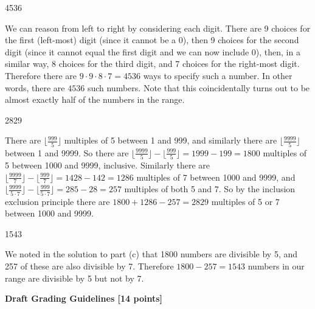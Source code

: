 \documentclass[12pt]{exam}
\begin{document}
\begin{solution}
\begin{qparts}
    \item 4536
    
    We can reason from left to right by considering each digit. There are 9 choices for the first (left-most) digit (since it cannot be a 0), then 9 choices for the second digit (since it cannot equal the first digit and we can now include 0), then, in a similar way, 8 choices for the third digit, and 7 choices for the right-most digit.  Therefore there are $9\cdot9\cdot8\cdot7 = 4536$ ways to specify such a number. In other words, there are $4536$ such numbers. Note that this coincidentally turns out to be almost exactly half of the numbers in the range.

    \item 2829
    
    There are $\lfloor \frac{999}{5}\rfloor$ multiples of 5 between 1 and 999, and similarly there are $\lfloor \frac{9999}{5}\rfloor$ between 1 and 9999. So there are $\lfloor \frac{9999}{5}\rfloor - \lfloor \frac{999}{5}\rfloor = 1999 - 199 = 1800$ multiples of 5 between 1000 and 9999, inclusive. Similarly there are $\lfloor \frac{9999}{7}\rfloor - \lfloor \frac{999}{7}\rfloor = 1428 - 142 = 1286$ multiples of 7 between 1000 and 9999, and $\lfloor \frac{9999}{5\cdot 7}\rfloor - \lfloor \frac{999}{5\cdot 7}\rfloor = 285-28 = 257$ multiples of both 5 and 7. So by the inclusion exclusion principle there are $1800 + 1286 - 257 = 2829$ multiples of 5 or 7 between 1000 and 9999.

    \item 1543
    
    We noted in the solution to part (c) that 1800 numbers are divisible by 5, and 257 of these are also divisible by 7. Therefore $1800 - 257 = 1543$ numbers in our range are divisible by 5 but not by 7.
\end{qparts}

\textbf{Draft Grading Guidelines [14 points]}


\end{solution}
\end{document}
